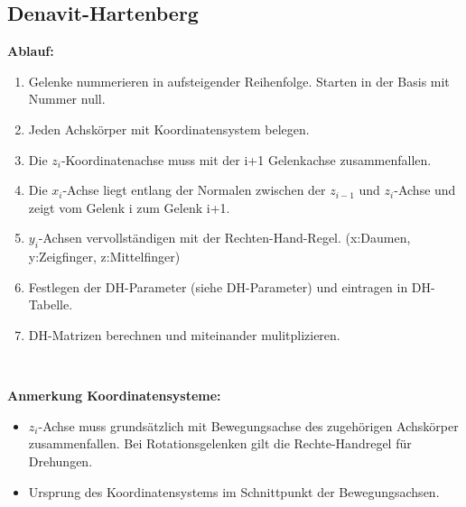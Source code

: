 \clearpage
\subsection{Denavit-Hartenberg}
\begin{minipage}{19cm}
    \textbf{Ablauf:}
    \begin{enumerate}{\setlength{\itemsep}{0cm}\setlength{\parsep}{0cm} \setlength{\topsep}{0cm}}
        \item Gelenke nummerieren in aufsteigender Reihenfolge. Starten in der Basis mit Nummer null.
        \item Jeden Achskörper mit Koordinatensystem belegen.
        \item Die $z_i$-Koordinatenachse muss mit der i+1 Gelenkachse zusammenfallen.
        \item Die $x_i$-Achse liegt entlang der Normalen zwischen der $z_{i-1}$ und $z_i$-Achse und zeigt vom Gelenk i zum Gelenk i+1.
        \item $y_i$-Achsen vervollständigen mit der Rechten-Hand-Regel. (x:Daumen, y:Zeigfinger, z:Mittelfinger)
        \item Festlegen der DH-Parameter (siehe DH-Parameter) und eintragen in DH-Tabelle.
        \item DH-Matrizen berechnen und miteinander mulitplizieren.
    \end{enumerate}
    \vspace{0.2cm}
\end{minipage}\\

\begin{minipage}{19cm}
    \textbf{Anmerkung Koordinatensysteme:}
    \begin{itemize}\itemsep0pt
        \item $z_i$-Achse muss grundsätzlich mit Bewegungsachse des zugehörigen Achskörper zusammenfallen.
        Bei Rotationsgelenken gilt die Rechte-Handregel für Drehungen. 
        \item Ursprung des Koordinatensystems im Schnittpunkt der Bewegungsachsen.
    \end{itemize}
    \vspace{0.2cm}
\end{minipage}\\

